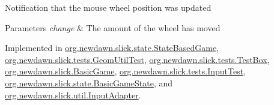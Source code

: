 Notification that the mouse wheel position was updated


\begin{DoxyParams}{Parameters}
{\em change} & The amount of the wheel has moved \\
\hline
\end{DoxyParams}


Implemented in \mbox{\hyperlink{classorg_1_1newdawn_1_1slick_1_1state_1_1_state_based_game_a58843de40efec58100335c27499d1bd2}{org.\+newdawn.\+slick.\+state.\+State\+Based\+Game}}, \mbox{\hyperlink{classorg_1_1newdawn_1_1slick_1_1tests_1_1_geom_util_test_a6bd1586a0c904f38e392b8d9b878c5f5}{org.\+newdawn.\+slick.\+tests.\+Geom\+Util\+Test}}, \mbox{\hyperlink{classorg_1_1newdawn_1_1slick_1_1tests_1_1_test_box_a60b5186b990f70fcd47d459a75e80eb5}{org.\+newdawn.\+slick.\+tests.\+Test\+Box}}, \mbox{\hyperlink{classorg_1_1newdawn_1_1slick_1_1_basic_game_a28f0cdd4678843d738312a0fa49d5cc3}{org.\+newdawn.\+slick.\+Basic\+Game}}, \mbox{\hyperlink{classorg_1_1newdawn_1_1slick_1_1tests_1_1_input_test_af9fe762d2e11ec43fd4676e7678649bd}{org.\+newdawn.\+slick.\+tests.\+Input\+Test}}, \mbox{\hyperlink{classorg_1_1newdawn_1_1slick_1_1state_1_1_basic_game_state_ab4d1fd4e3f8f09700b62bb37fd29006a}{org.\+newdawn.\+slick.\+state.\+Basic\+Game\+State}}, and \mbox{\hyperlink{classorg_1_1newdawn_1_1slick_1_1util_1_1_input_adapter_aecf65d222bf9de39735ce38ae2f97ad3}{org.\+newdawn.\+slick.\+util.\+Input\+Adapter}}.

